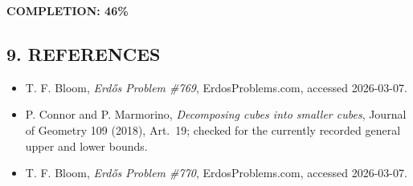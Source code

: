 \textbf{COMPLETION: 46\%}

\subsection*{9. REFERENCES}

\begin{itemize}
\item T. F. Bloom, \emph{Erd\H{o}s Problem \#769}, ErdosProblems.com, accessed 2026-03-07.
\item P. Connor and P. Marmorino, \emph{Decomposing cubes into smaller cubes}, Journal of Geometry 109 (2018), Art.~19; checked for the currently recorded general upper and lower bounds.
\item T. F. Bloom, \emph{Erd\H{o}s Problem \#770}, ErdosProblems.com, accessed 2026-03-07.
\end{itemize}

